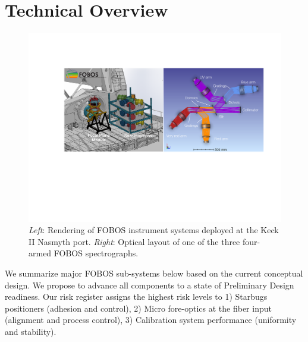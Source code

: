 \documentclass[oneside,11pt]{amsart}
\newcommand{\comment}[2][todo]{{\color{#1}[[{\bf #2}]]}}
\begin{document}
\section{Technical Overview}
\label{sec:project}



\begin{figure}[h!]
%
\vskip -0.1in
%
\includegraphics[width=\textwidth]{figs/FOBOS_inst_2019-10-28.pdf}
%
\caption{\small {\it Left}: Rendering of FOBOS instrument systems
deployed at the Keck II Nasmyth port.  {\it Right}: Optical layout of one of
the three four-armed FOBOS spectrographs.}
%
\label{fig:layout}
%
\end{figure}

We summarize major FOBOS sub-systems below based on the current conceptual design.  We propose to advance all components to a state of Preliminary Design readiness.  Our risk register assigns the highest risk levels to 1) Starbugs positioners (adhesion and control), 2) Micro fore-optics at the fiber input (alignment and process control), 3) Calibration system performance (uniformity and stability).
\end{document}

